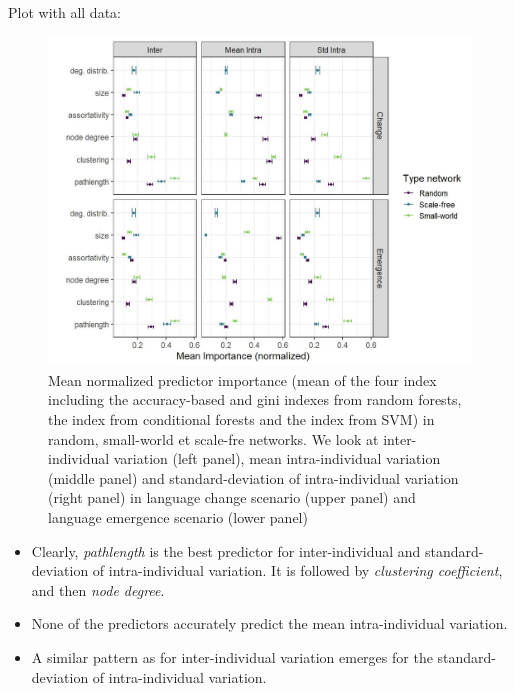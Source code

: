 \documentclass[
]{article}
\providecommand{\tightlist}{%
  \setlength{\itemsep}{0pt}\setlength{\parskip}{0pt}}
\begin{document}
Plot with all data:

\begin{figure}[!H]

{\centering \includegraphics{./Figures/unnamed-chunk-116-1} 

}

\caption{Mean normalized predictor importance (mean of the four index including the accuracy-based and gini indexes from random forests, the index from conditional forests and the index from SVM) in random, small-world et scale-fre networks. We look at inter-individual variation (left panel), mean intra-individual variation (middle panel) and standard-deviation of intra-individual variation (right panel) in language change scenario (upper panel) and language emergence scenario (lower panel)}\label{fig:unnamed-chunk-116}
\end{figure}

\begin{itemize}
\tightlist
\item
  Clearly, \emph{pathlength} is the best predictor for inter-individual
  and standard-deviation of intra-individual variation. It is followed
  by \emph{clustering coefficient}, and then \emph{node degree}.
\item
  None of the predictors accurately predict the mean intra-individual
  variation.
\item
  A similar pattern as for inter-individual variation emerges for the
  standard-deviation of intra-individual variation.
\end{itemize}
\end{document}
